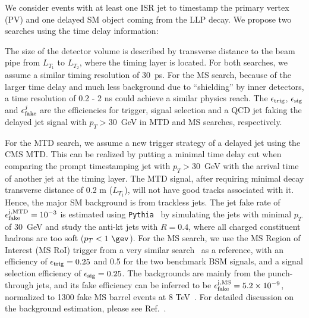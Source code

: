 We consider events with at least one ISR jet to timestamp the primary vertex (PV) and one delayed SM object coming from the LLP decay. We propose two searches using the time delay information:
\begin{center}
\end{center}
The size of the detector volume is described by transverse distance to the beam pipe from $L_{T_1}$ to $L_{T_2}$, where the timing layer
is located. For both searches, we assume a similar timing resolution of 30~ps.
For the MS search, because of the larger time delay and much less background due to ``shielding'' by inner detectors, 
a time resolution of 0.2 - 2 ns could achieve a similar physics reach. The $\epsilon_{\rm trig}$, 
$\epsilon_{\rm sig}$ and $\epsilon_{\rm fake}^j$ are the efficiencies for trigger, signal selection and a QCD jet faking the delayed jet signal with $p_T>30$~GeV in MTD and MS searches, respectively. 

For the MTD search, we assume a new trigger strategy of a delayed jet using the CMS MTD.
This can be realized by putting a minimal time delay cut when comparing the prompt timestamping jet with $p_T > 30$~GeV with the arrival time of another jet at the timing layer. 
The MTD signal, after requiring minimal decay transverse distance of 0.2 m ($L_{T_1}$), will not 
have good tracks associated with it. Hence, the major SM background is from trackless jets.
The jet fake rate of $\epsilon_{\rm fake}^{\rm j, MTD} = 10^{-3}$ is estimated
using {\tt Pythia}~\cite{Sjostrand:2007gs} by simulating the jets with minimal $p_T$ of 30~GeV and study the anti-kt jets with $R=0.4$, where all charged constituent hadrons are too soft ($p_T<1~\gev$). 
For the MS search, we use the MS Region 
of Interest (MS RoI) trigger from a very similar search~\cite{Aaboud:2017iio} as a reference, with an efficiency 
of $\epsilon_{\rm trig}=0.25$ and 0.5 for the two benchmark BSM signals, and a signal selection efficiency of 
$\epsilon_{\rm sig}=0.25$. The backgrounds are mainly from the punch-through jets, and its  fake efficiency can be inferred 
to be $\epsilon_{\rm fake}^{\rm j, MS} = 5.2 \times 10^{-9}$, normalized to 1300 fake MS barrel events at 8 TeV~\cite{Aaboud:2017iio}.
For detailed discussion on the background estimation, please see Ref.~\cite{Liu:2018wte}.
\\

